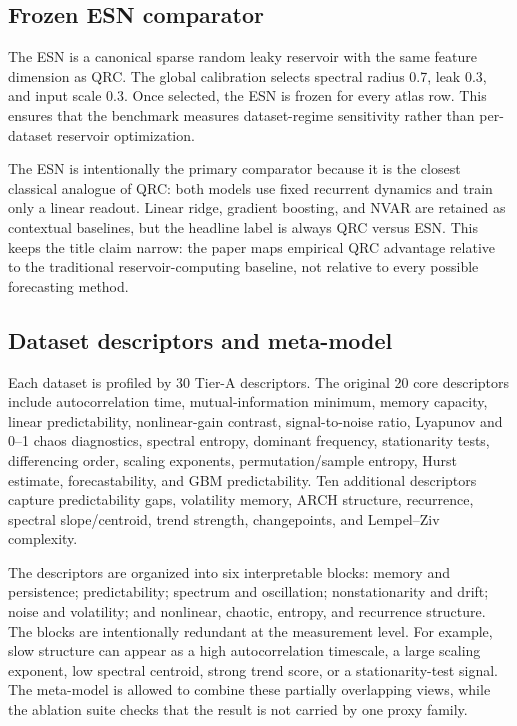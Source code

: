 \subsection{Frozen ESN comparator}

The ESN is a canonical sparse random leaky reservoir with the same feature dimension as QRC. The global calibration selects spectral radius 0.7, leak 0.3, and input scale 0.3. Once selected, the ESN is frozen for every atlas row. This ensures that the benchmark measures dataset-regime sensitivity rather than per-dataset reservoir optimization.

The ESN is intentionally the primary comparator because it is the closest classical analogue of QRC: both models use fixed recurrent dynamics and train only a linear readout. Linear ridge, gradient boosting, and NVAR are retained as contextual baselines, but the headline label is always QRC versus ESN. This keeps the title claim narrow: the paper maps empirical QRC advantage relative to the traditional reservoir-computing baseline, not relative to every possible forecasting method.

\subsection{Dataset descriptors and meta-model}

Each dataset is profiled by 30 Tier-A descriptors. The original 20 core descriptors include autocorrelation time, mutual-information minimum, memory capacity, linear predictability, nonlinear-gain contrast, signal-to-noise ratio, Lyapunov and 0--1 chaos diagnostics, spectral entropy, dominant frequency, stationarity tests, differencing order, scaling exponents, permutation/sample entropy, Hurst estimate, forecastability, and GBM predictability. Ten additional descriptors capture predictability gaps, volatility memory, ARCH structure, recurrence, spectral slope/centroid, trend strength, changepoints, and Lempel--Ziv complexity.

The descriptors are organized into six interpretable blocks: memory and persistence; predictability; spectrum and oscillation; nonstationarity and drift; noise and volatility; and nonlinear, chaotic, entropy, and recurrence structure. The blocks are intentionally redundant at the measurement level. For example, slow structure can appear as a high autocorrelation timescale, a large scaling exponent, low spectral centroid, strong trend score, or a stationarity-test signal. The meta-model is allowed to combine these partially overlapping views, while the ablation suite checks that the result is not carried by one proxy family.

